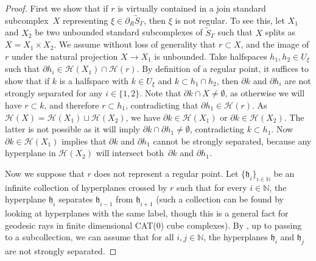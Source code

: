\begin{proof}
First we show that if $r$ is virtually contained in a join standard subcomplex~$X$ representing $\xi\in \partial_R \widetilde{S}_\Gamma$, then $\xi$ is not regular. To see this, let $X_1$ and $X_2$ be two unbounded standard subcomplexes of $\widetilde{S}_\Gamma$ such that $X$ splits as $X=X_1\times X_2$. We assume without loss of generality that $r\subset X$, and the image of $r$ under the natural projection $X\to X_1$ is unbounded. Take halfspaces $h_1,h_2\in U_\xi$ such that $\partial h_i\in \mathcal H(X_1)\cap\mathcal H(r)$. By definition of a regular point, it suffices to show that if $k$ is a halfspace with $k\in U_\xi$ and $k\subset h_1\cap h_2$, then $\partial k$ and $\partial h_i$ are not strongly separated for any $i\in\{1,2\}$. Note that $\partial k\cap X\neq \emptyset$, as otherwise we will have $r\subset k$, and therefore $r\subset h_1$, contradicting that $\partial h_1\in \mathcal H(r)$. As $\mathcal H(X)=\mathcal H(X_1)\sqcup\mathcal H(X_2)$, we have $\partial k\in \mathcal H(X_1)$ or $\partial k\in \mathcal H(X_2)$. The latter is not possible as it will imply $\partial k\cap\partial h_1\neq\emptyset$, contradicting $k\subset h_1$. Now $\partial k\in \mathcal H(X_1)$ implies that $\partial k$ and $\partial h_1$ cannot be strongly separated, because any hyperplane in $\mathcal H(X_2)$ will intersect both~$\partial k$ and $\partial h_1$.\enlargethispage{\baselineskip}%

Now we suppose that $r$ does not represent a regular point. Let $\{\mathfrak h_i\}_{i\in\mathbb{N}}$ be an infinite collection of hyperplanes crossed by $r$ such that for every $i\in\mathbb{N}$, the hyperplane $\mathfrak h_{i}$ separates $\mathfrak h_{i-1}$ from $\mathfrak h_{i+1}$ (such a collection can be found by looking at hyperplanes with the same label, though this is a general fact for geodesic rays in finite dimensional CAT(0) cube complexes). By \cite[Prop.\,7.5]{Fer}, up to passing to a subcollection, we can assume that for all $i,j\in\mathbb{N}$, the hyperplanes $\mathfrak h_i$ and $\mathfrak h_j$ are not strongly separated.


\end{proof}

